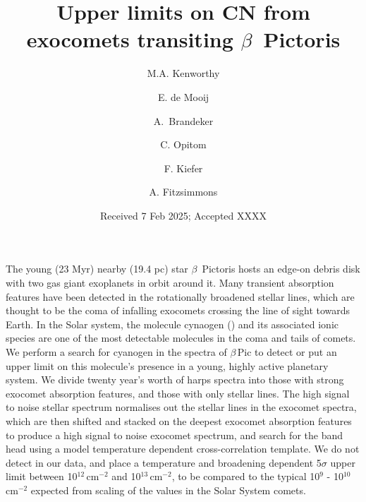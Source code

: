 \documentclass{aa}
\newcommand{\bp}{$\beta$\,Pic}
\begin{document}
 
   \title{Upper limits on CN from exocomets transiting $\beta$~Pictoris}
   \author{M.A. Kenworthy
          \and
          E. de Mooij
          \and
          A.\ Brandeker
          \and 
         C. Opitom
          \and
          F. Kiefer
          \and
          A. Fitzsimmons 
          }

   \date{Received 7 Feb 2025; Accepted XXXX}

 
  \abstract
   {The young (23 Myr) nearby (19.4 pc) star $\beta$~Pictoris hosts an edge-on debris disk with two gas giant exoplanets in orbit around it.
   Many transient absorption features have been detected in the rotationally broadened stellar lines, which are thought to be the coma of infalling exocomets crossing the line of sight towards Earth.}
   {In the Solar system, the molecule cynaogen () and its associated ionic species are one of the most detectable molecules in the coma and tails of comets.
   We perform a search for cyanogen in the spectra of \bp{} to detect or put an upper limit on this molecule's presence in a young, highly active planetary system.}
   {We divide twenty year's worth of \ac{harps} spectra into those with strong exocomet absorption features, and those with only stellar lines.
   The high signal to noise stellar spectrum normalises out the stellar lines in the exocomet spectra, which are then shifted and stacked on the deepest exocomet absorption features to produce a high signal to noise exocomet spectrum, and search for the  band head using a model temperature dependent cross-correlation template.}
   {We do not detect  in our data, and place a temperature and broadening dependent 5$\sigma$ upper limit between 10$^{12}$\,cm$^{-2}$ and 10$^{13}$\,cm$^{-2}$, to be compared to the typical 10$^9$ - 10$^{10}$ cm$^{-2}$ expected from scaling of the values in the Solar System comets.}
\end{document}
